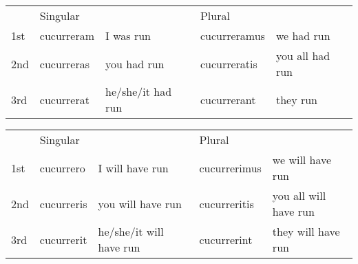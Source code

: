 \begin{center}  
  \begin{tabular}{lllll}
    \centering
    & Singular & & Plural &  \\
    1st & cucurreram & I was run & cucurreramus & we had run \\
    2nd & cucurreras & you had run & cucurreratis & you all had run \\ 
    3rd & cucurrerat & he/she/it had run & cucurrerant & they run \\
  \end{tabular}
\end{center}


\begin{center}  
  \begin{tabular}{lllll}
    \centering
    & Singular & & Plural &  \\
    1st & cucurrero & I will have run & cucurrerimus & we will have run\\
    2nd & cucurreris & you will have run & cucurreritis & you all will have run\\ 
    3rd & cucurrerit & he/she/it will have run & cucurrerint & they will have run \\
  \end{tabular}
\end{center}


